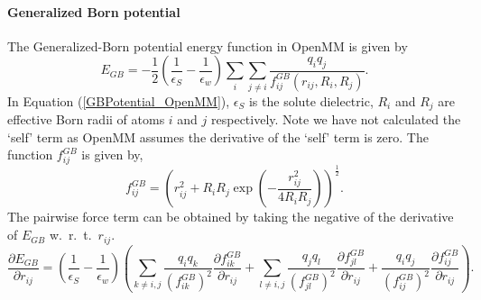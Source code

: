 \documentclass[12pt]{article}
\begin{document}
\paragraph{Generalized Born potential}
The Generalized-Born potential energy function in OpenMM is given by
\begin{equation}
\label{GBPotential_OpenMM}
E_{GB} = -\frac{1}{2}\left(
\frac{1}{{\epsilon}_{S}} - \frac{1}{{\epsilon}_{w}}\right)\displaystyle\sum_{i}\displaystyle\sum_{j\ne i}\frac{q_{i}q_{j}}{f_{ij}^{GB}(r_{ij},R_{i},R_{j})}.
\end{equation}
In Equation (\ref{GBPotential_OpenMM}), ${\epsilon}_{S}$ is the solute dielectric,
$R_{i}$ and $R_{j}$ are effective Born radii of atoms $i$ and $j$ respectively.
Note we have not calculated the `self' term as OpenMM assumes the derivative of the `self' term is zero.
The function
$f_{ij}^{GB}$ is given by,
\begin{equation}
\label{fGBEq}
f_{ij}^{GB} =\left(r_{ij}^{2} + R_{i}R_{j}\exp\left(-\frac{r_{ij}^{2}}{4R_{i}R_{j}}\right)\right)^{\frac{1}{2}}.
\end{equation}
The pairwise force term can be obtained by taking the negative of the derivative of $E_{GB}$ w.~r.~t.~$r_{ij}$.
\begin{equation}
\label{eq:EGBderv1}
\frac{\partial E_{GB}}{\partial r_{ij}} = \left(\frac{1}{{\epsilon}_{S}} - \frac{1}{{\epsilon}_{w}}\right)
\left(\displaystyle\sum_{k\ne i, j}\frac{q_{i}q_{k}}{\left(f_{ik}^{GB}\right)^2}\frac{\partial f_{ik}^{GB}}{\partial r_{ij}}+
\displaystyle\sum_{l\ne i,j}\frac{q_{j}q_{l}}{\left(f_{jl}^{GB}\right)^2}\frac{\partial f_{jl}^{GB}}{\partial r_{ij}}+
\frac{q_{i}q_{j}}{\left(f_{ij}^{GB}\right)^2}\frac{\partial f_{ij}^{GB}}{\partial r_{ij}}\right).
\end{equation}
\end{document}
